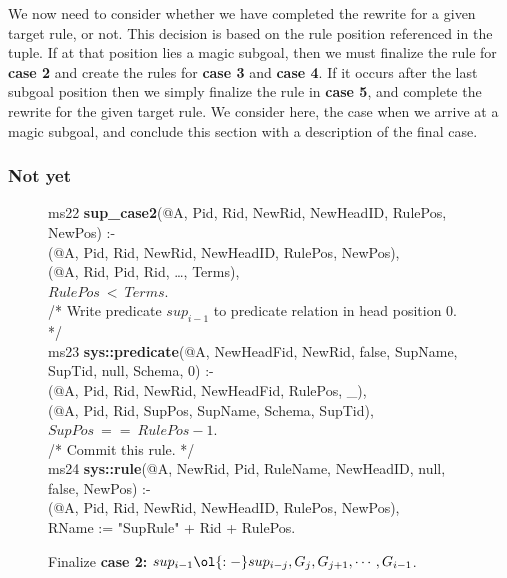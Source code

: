 We now need to consider whether we have completed the rewrite for a given
target rule, or not.  This decision is based on the rule position referenced in
the  tuple.  If at that position lies a magic subgoal, then we must
finalize the rule for {\bf case 2} and create the rules for {\bf case 3} and
{\bf case 4}.  If it occurs after the last subgoal position then we simply
finalize the rule in {\bf case 5}, and complete the rewrite for the given
target rule.  We consider here, the case when we arrive at a magic subgoal, and
conclude this section with a description of the final case.

\subsubsection{Not yet}

\begin{figure}[!t]
\ssp
\centering
\begin{boxedminipage}{\linewidth}
ms22 {\bf sup\_case2}(@A, Pid, Rid, NewRid, NewHeadID, RulePos, NewPos) :- \\
(@A, Pid, Rid, NewRid, NewHeadID, RulePos, NewPos), \\
(@A, Rid, Pid, Rid, \ldots, Terms), \\
\datalogspace $RulePos\ <\ Terms$. \\

/* Write predicate $sup_{i-1}$ to predicate relation in head position $0$. */ \\
ms23 {\bf sys::predicate}(@A, NewHeadFid, NewRid, false, SupName, SupTid, null, Schema, 0) :- \\
(@A, Pid, Rid, NewRid, NewHeadFid, RulePos, \_), \\
(@A, Pid, Rid, SupPos, SupName, Schema, SupTid), \\
\datalogspace $SupPos\ ==\ RulePos - 1$. \\
  
/* Commit this rule. */ \\
ms24 {\bf sys::rule}(@A, NewRid, Pid, RuleName, NewHeadID, null, false, NewPos) :- \\
(@A, Pid, Rid, NewRid, NewHeadID, RulePos, NewPos), \\
\datalogspace RName := "SupRule" + Rid + RulePos.

\end{boxedminipage}
\caption{\label{ch:magic:fig:rewrite5} 
Finalize {\bf case 2:} $sup_{i-1} \ol{:-} sup_{i-j}, G_j, G_{j+1}, \cdots, G_{i-1}$.}
\end{figure}

